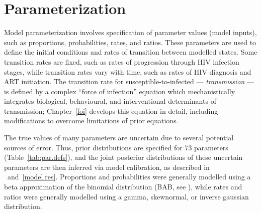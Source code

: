 \section{Parameterization}\label{model.par}
Model parameterization involves specification of parameter values (model inputs),
such as proportions, probabilities, rates, and ratios.
These parameters are used to define
the initial conditions and rates of transition between modelled states.
Some transition rates are fixed, such as rates of progression through HIV infection stages,
while transition rates vary with time, such as rates of HIV diagnosis and ART initiation.
The transition rate for susceptible-to-infected --- \ie \emph{transmission} ---
is defined by a complex ``force of infection'' equation which mechanistically integrates
biological, behavioural, and interventional determinants of transmission;
Chapter~\ref{foi} develops this equation in detail,
including modifications to overcome limitations of prior equations.
\par
The true values of many parameters are uncertain due to several potential sources of error.
Thus, prior distributions are specified for 73 parameters (Table~\ref{tab:par.defs}),
and the joint posterior distributions of these uncertain parameters are then inferred
via model calibration, as described in ~and~\ref{model.res}.
Proportions and probabilities were generally modelled using
a beta approximation of the binomial distribution (BAB, see ),
while rates and ratios were generally modelled using
a gamma, skewnormal, or inverse gaussian distribution.








